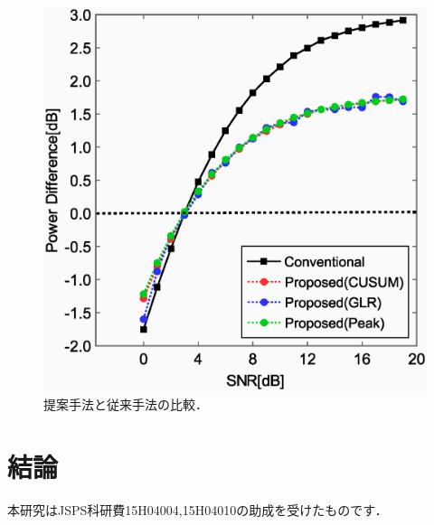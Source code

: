 \documentclass[technicalreport]{ieicej}
\begin{document}
\begin{figure}[t]
\centering
\includegraphics[width=0.8\hsize,clip]{peak.eps}
\caption{提案手法と従来手法の比較．}
\label{peak}
\end{figure}


\section{結論}
\label{sec:conclusion}

\ack

本研究はJSPS科研費15H04004,15H04010の助成を受けたものです．
\end{document}
